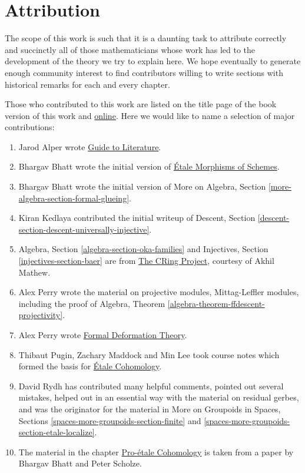 \section{Attribution}
\label{section-attribution}

\noindent
The scope of this work is such that it is a daunting task to attribute
correctly and succinctly all of those mathematicians whose work has led
to the development of the theory we try to explain here. We hope eventually
to generate enough community interest to find contributors willing to write
sections with historical remarks for each and every chapter.

\medskip\noindent
Those who contributed to this work are listed on the title page of the book
version of this work and
\href{http://stacks.math.columbia.edu/tex/CONTRIBUTORS}{online}.
Here we would like to name a selection of major contributions:
\begin{enumerate}
\item Jarod Alper wrote
\hyperref[guide-section-phantom]{Guide to Literature}.
\item Bhargav Bhatt wrote the initial version of
\hyperref[etale-section-phantom]{\'Etale Morphisms of Schemes}.
\item Bhargav Bhatt wrote the initial version of
More on Algebra, Section \ref{more-algebra-section-formal-glueing}.
\item Kiran Kedlaya contributed the initial writeup of
Descent, Section \ref{descent-section-descent-universally-injective}.
\item Algebra, Section \ref{algebra-section-oka-families}
and Injectives, Section \ref{injectives-section-baer}
are from
\href{http://people.fas.harvard.edu/~amathew/cr.html}{The CRing Project},
courtesy of Akhil Mathew.
\item Alex Perry wrote the material on projective modules,
Mittag-Leffler modules, including the proof of
Algebra, Theorem \ref{algebra-theorem-ffdescent-projectivity}.
\item Alex Perry wrote
\hyperref[formal-defos-section-phantom]%
{Formal Deformation Theory}.
\item Thibaut Pugin, Zachary Maddock and Min Lee took course notes
which formed the basis for
\hyperref[etale-cohomology-section-phantom]{\'Etale Cohomology}.
\item David Rydh has contributed many helpful comments, pointed out several
mistakes, helped out in an essential way with the material on residual gerbes,
and was the originator for the material in
More on Groupoids in Spaces, Sections
\ref{spaces-more-groupoids-section-finite} and
\ref{spaces-more-groupoids-section-etale-localize}.
\item The material in the chapter
\hyperref[proetale-section-phantom]{Pro-\'etale Cohomology}
is taken from a paper by Bhargav Bhatt and Peter Scholze.
\end{enumerate}









